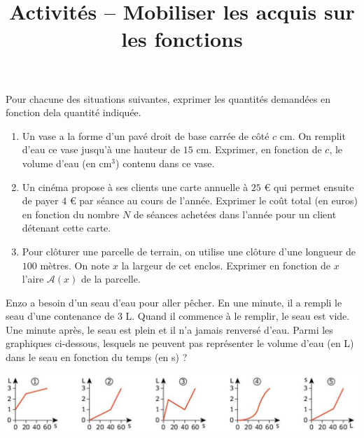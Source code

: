 \documentclass[a4paper]{article}
\begin{document}
\title{Activités -- Mobiliser les acquis sur les fonctions}

\pagestyle{empty}

\date{}
\author{}

\maketitle{}
\thispagestyle{empty}

\exo Pour chacune des situations suivantes, exprimer les quantités demandées \og{}en fonction de\fg{}la quantité indiquée.

\begin{enumerate}
  \item Un vase a la forme d'un pavé droit de base carrée de côté $c$ cm. On remplit d'eau ce vase jusqu'à une hauteur de $15$ cm. Exprimer, en fonction de $c$, le volume d'eau (en cm$^3$) contenu dans ce vase.
  \item Un cinéma propose à ses clients une carte annuelle à $25$ \euro{} qui permet ensuite de payer $4$ \euro{} par séance au cours de l'année. Exprimer le coût total (en euros) en fonction du nombre $N$ de séances achetées dans l'année pour un client détenant cette carte.
  \item Pour clôturer une parcelle de terrain, on utilise une clôture d'une longueur de $100$ mètres. On note $x$ la largeur de cet enclos. Exprimer en fonction de $x$ l'aire $\mathcal{A}(x)$ de la parcelle.
\end{enumerate}

\bigskip

\exo Enzo a besoin d'un seau d'eau pour aller pêcher. En une minute, il a rempli le seau d'une contenance de $3$ L. Quand il commence à le remplir, le seau est vide. Une minute après, le seau est plein et il n'a jamais renversé d'eau. Parmi les graphiques ci-dessous, lesquels ne peuvent pas représenter le volume d'eau (en L) dans le seau en fonction du temps (en s) ?

\begin{center}
  \includegraphics[width=16cm]{7_1_mobiliser_les_acquis_sur_les_fonctions_seau.png}
\end{center}

\bigskip
\end{document}
